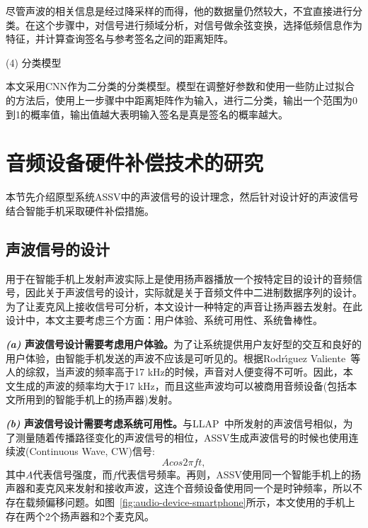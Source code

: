 尽管声波的相关信息是经过降采样的而得，他的数据量仍然较大，不宜直接进行分类。在这个步骤中，对信号进行频域分析，对信号做余弦变换，选择低频信息作为特征，并计算查询签名与参考签名之间的距离矩阵。

(4) 分类模型

本文采用CNN作为二分类的分类模型。模型在调整好参数和使用一些防止过拟合的方法后，使用上一步骤中中距离矩阵作为输入，进行二分类，输出一个范围为0到1的概率值，输出值越大表明输入签名是真是签名的概率越大。

\section{音频设备硬件补偿技术的研究}

本节先介绍原型系统ASSV中的声波信号的设计理念，然后针对设计好的声波信号结合智能手机采取硬件补偿措施。

\subsection{声波信号的设计}

用于在智能手机上发射声波实际上是使用扬声器播放一个按特定目的设计的音频信号，因此关于声波信号的设计，实际就是关于音频文件中二进制数据序列的设计。为了让麦克风上接收信号可分析，本文设计一种特定的声音让扬声器去发射。在此设计中，本文主要考虑三个方面：用户体验、系统可用性、系统鲁棒性。

\textbf{\textit{(a)} 声波信号设计需要考虑用户体验。}为了让系统提供用户友好型的交互和良好的用户体验，由智能手机发送的声波不应该是可听见的。根据Rodr{\'\i}guez Valiente~\cite{rodriguez2014extended}等人的综叙，当声波的频率高于17 kHz的时候，声音对人便变得不可听。因此，本文生成的声波的频率均大于17 kHz，而且这些声波均可以被商用音频设备(包括本文所用到的智能手机上的扬声器)发射。

\textbf{\textit{(b)} 声波信号设计需要考虑系统可用性。}与LLAP~\cite{wang2016device}中所发射的声波信号相似，为了测量随着传播路径变化的声波信号的相位，ASSV生成声波信号的时候也使用连续波(Continuous Wave, CW)信号:
$$
Acos2\pi ft, 
$$
其中$A$代表信号强度，而$f$代表信号频率。再则，ASSV使用同一个智能手机上的扬声器和麦克风来发射和接收声波，这连个音频设备使用同一个是时钟频率，所以不存在载频偏移问题。如图~\ref{fig:audio-device-smartphone}所示，本文使用的手机上存在两个2个扬声器和2个麦克风。


